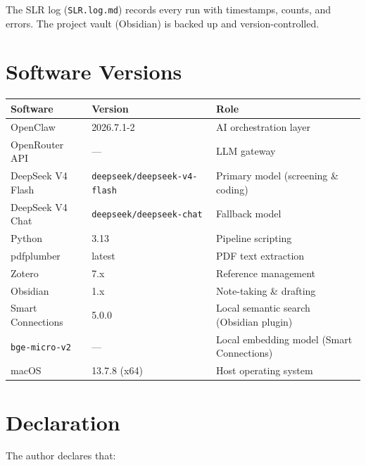 The SLR log (\texttt{SLR.log.md}) records every run with timestamps, counts, and errors. The project vault (Obsidian) is backed up and version-controlled.

\section{Software Versions}

\begin{table}[H]
\centering
\begin{tabular}{lp{4.5cm}p{5.5cm}}
\toprule
\textbf{Software} & \textbf{Version} & \textbf{Role} \\
\midrule
OpenClaw & 2026.7.1-2 & AI orchestration layer \\
OpenRouter API & --- & LLM gateway \\
DeepSeek V4 Flash & \texttt{deepseek/\allowbreak deepseek-v4-flash} & Primary model (screening \& coding) \\
DeepSeek V4 Chat & \texttt{deepseek/\allowbreak deepseek-chat} & Fallback model \\
Python & 3.13 & Pipeline scripting \\
pdfplumber & latest & PDF text extraction \\
Zotero & 7.x & Reference management \\
Obsidian & 1.x & Note-taking \& drafting \\
Smart Connections & 5.0.0 & Local semantic search (Obsidian plugin) \\
\texttt{bge-micro-v2} & --- & Local embedding model (Smart Connections) \\
macOS & 13.7.8 (x64) & Host operating system \\
\bottomrule
\end{tabular}
\end{table}

\section{Declaration}

The author declares that:

